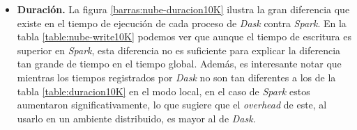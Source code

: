 \begin{itemize}
	\item \textbf{Duración.} La figura \ref{barras:nube-duracion10K} ilustra la gran diferencia que existe en el tiempo de ejecución de cada proceso de \textit{Dask} contra \textit{Spark}. En la tabla \ref{table:nube-write10K} podemos ver que aunque el tiempo de escritura es superior en \textit{Spark}, esta diferencia no es suficiente para explicar la diferencia tan grande de tiempo en el tiempo global. Además, es interesante notar que mientras los tiempos registrados por \textit{Dask} no son tan diferentes a los de la tabla \ref{table:duracion10K} en el modo local, en el caso de \textit{Spark} estos aumentaron significativamente, lo que sugiere que el \textit{overhead} de este, al usarlo en un ambiente distribuido, es mayor al de \textit{Dask}.
	
\end{itemize}


